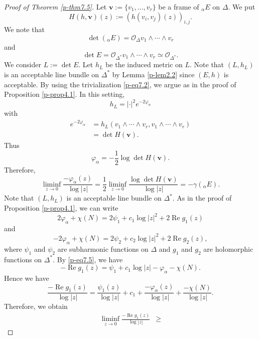 \documentclass[12pt,twoside]{amsart}
\DeclareMathOperator{\re}{Re}
\theoremstyle{definition}
\begin{document}
\begin{proof}[Proof of Theorem \ref{p-thm7.5}]
Let $\bm v:=\{v_1, \ldots, v_r\}$ be a frame of ${}_\alpha E$ on $\Delta$. 
We put 
\[
H(h, \bm v)(z):=\left(h(v_i, v_j)(z)\right)_{i, j}. 
\] 
We note that 
\[
\det ({}_\alpha E)=\mathcal O_\Delta v_1\wedge \cdots \wedge v_r
\] 
and 
\begin{equation}\label{p-eq7.2}
\det E=\mathcal O_{\Delta^*}v_1\wedge \cdots \wedge v_r\simeq 
\mathcal O_{\Delta^*}. 
\end{equation} 
We consider $L:=\det E$. Let $h_L$ be the induced metric on $L$. 
Note that $(L, h_L)$ is an acceptable line bundle on $\Delta^*$ 
by Lemma \ref{p-lem2.2} since $(E, h)$ is acceptable. 
By using the trivialization \eqref{p-eq7.2}, 
we argue as in the proof of Proposition \ref{p-prop4.1}. 
In this setting, 
\[
h_L=|\cdot |^2 e^{-2\varphi_\alpha}
\] 
with 
\begin{equation}\label{p-eq7.3}
\begin{split}
e^{-2\varphi_\alpha} &=h_L(v_1\wedge \cdots \wedge v_r, v_1\wedge \cdots \wedge v_r) 
\\&=\det H(\bm v). 
\end{split}
\end{equation} 
Thus 
\[
\varphi_\alpha=-\frac{1}{2} \log \det H(\bm v). 
\] 
Therefore, 
\begin{equation}\label{p-eq7.4}
\liminf_{z\to 0} \frac{-\varphi_\alpha(z)}{\log |z|} 
=\frac{1}{2} \liminf_{z\to 0} \frac{\log \det H(\bm v)}{\log |z|} 
=-\gamma ({}_\alpha E). 
\end{equation} 
Note that $(L, h_L)$ is an acceptable line bundle on $\Delta^*$. 
As in the proof of Proposition \ref{p-prop4.1}, we can write 
\begin{equation}\label{p-eq7.5}
2\varphi_\alpha +\chi (N)=2\psi_1+c_1\log |z|^2+2\re g_1(z)
\end{equation}
and 
\begin{equation}\label{p-eq7.6}
-2\varphi_\alpha +\chi (N)=2\psi_2+c_2\log |z|^2+2\re g_2(z), 
\end{equation} 
where $\psi_1$ and $\psi_2$ are subharmonic functions on $\Delta$ and 
$g_1$ and $g_2$ are holomorphic functions on $\Delta^*$. 
By \eqref{p-eq7.5}, we have 
\[
-\re g_1(z)=\psi_1+c_1\log |z|-\varphi_\alpha -\chi (N). 
\]
Hence we have 
\[
\frac{-\re g_1(z)}{\log |z|}=\frac{\psi_1(z)}{\log |z|}
+c_1+\frac{-\varphi_\alpha(z)}{\log |z|}
+\frac{-\chi(N)}{\log|z|}. 
\] 
Therefore, we obtain 
\[
\begin{split}
\liminf_{z\to 0}\frac{-\re g_1(z)}{\log |z|}&\geq 

\end{split}\]
\end{proof}
\end{document}
